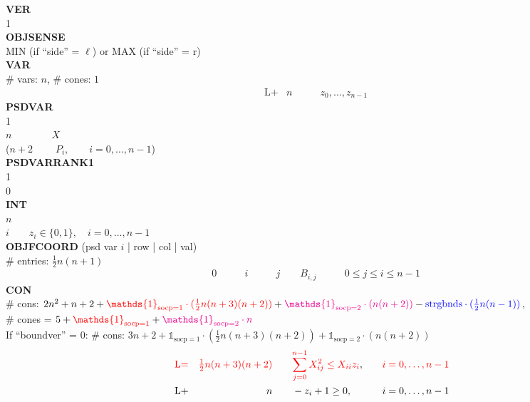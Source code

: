 \documentclass[11pt,a4paper]{article}
\newcommand{\ones}{\mathds{1}}
\theoremstyle{definition}
\begin{document}
{\footnotesize
\noindent
\textbf{VER} \\
1 \\
\textbf{OBJSENSE} \\
MIN (if ``side'' = $\ell$) \; or \; MAX (if ``side'' = r) \\
\textbf{VAR} \\
\# vars:  $n$, \qquad \# cones: $1$ \\
\[
  \begin{aligned}
    &\text{L+} &n \qquad & z_0,\dots,z_{n-1}
  \end{aligned}
\]
\textbf{PSDVAR} \\
1  \\
$n \qquad \qquad X$ \\
{\color{red} ($n+2 \qquad \; P_i, \qquad i = 0,\dots,n-1$)}\\
{\color{green}\textbf{PSDVARRANK1}  \\
1 \\
0\\}
\textbf{INT} \\
$n$ \\
$i \qquad z_i \in \{0,1\}, \quad i = 0,\dots,n-1$ \\
\textbf{OBJFCOORD} (psd var $i$ | row | col | val) \\
\# entries: $\tfrac{1}{2}n(n+1)$\\
\[
  \begin{aligned}
    &0 \qquad &i \qquad &j \qquad B_{i,j} \qquad & 0\leq j \leq i \leq n-1
  \end{aligned}
\]
\textbf{CON} \\
\# cons:
$2n^2+n+2 +
{\color{red}\ones_{\text{socp}=1}\cdot(\tfrac{1}{2}n(n+3)(n+2))} +
{\color{magenta}\ones_{\text{socp}=2}\cdot(n(n+2))} - {\color{blue}
  \text{strgbnds} \cdot (\tfrac{1}{2}n(n-1))}$, \\
\# cones = $5 + {\color{red} \ones_{\text{socp}=1}} + {\color{magenta}
  \ones_{\text{socp}=2} \cdot n}$\\
{\color{violet} If ``boundver'' = 0: \# cons: $3n+2 +
  \ones_{\text{socp}=1}\cdot(\tfrac{1}{2}n(n+3)(n+2)) +
  \ones_{\text{socp}=2}\cdot(n(n+2)) $} \\
\[
  \begin{aligned}
    &{\color{red}\text{L=}} & {\color{red}\tfrac{1}{2}n(n+3)(n+2)} \qquad 
    &{\color{red} \sum_{j=0}^{n-1} X_{ij}^2 \leq X_{ii}z_i}, \quad &
    {\color{red} i = 0,\dots, n-1} \\
    &\text{L+} &n \qquad & -z_i + 1 \geq 0, \quad & i = 0,\dots,n-1 \\

\end{aligned}\]}
\end{document}
